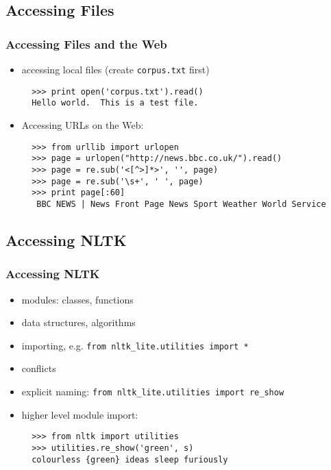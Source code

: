 \documentclass{beamer}             %
\begin{document}
\subsection{Accessing Files}

\begin{frame}[fragile]
\frametitle{Accessing Files and the Web}
\begin{itemize}
\item accessing local files (create \texttt{corpus.txt} first)

\begin{verbatim}
  >>> print open('corpus.txt').read() 
  Hello world.  This is a test file.
\end{verbatim}

\item Accessing URLs on the Web:

\begin{verbatim}
  >>> from urllib import urlopen
  >>> page = urlopen("http://news.bbc.co.uk/").read()
  >>> page = re.sub('<[^>]*>', '', page)
  >>> page = re.sub('\s+', ' ', page)
  >>> print page[:60]
   BBC NEWS | News Front Page News Sport Weather World Service
\end{verbatim}
\end{itemize}
\end{frame}

\subsection{Accessing NLTK}

\begin{frame}[fragile]
\frametitle{Accessing NLTK}

\begin{itemize}
\item modules: classes, functions
\item data structures, algorithms
\item importing, e.g. \texttt{from nltk\_lite.utilities import *}
\item conflicts
\item explicit naming: \texttt{from nltk\_lite.utilities import re\_show}
\item higher level module import:

\begin{verbatim}
  >>> from nltk import utilities
  >>> utilities.re_show('green', s)
  colourless {green} ideas sleep furiously
\end{verbatim}
\end{itemize}
\end{frame}
\end{document}
